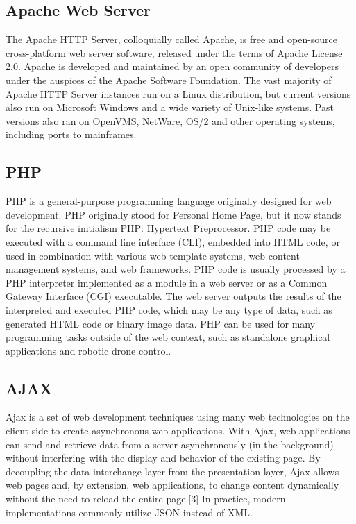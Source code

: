 \documentclass[12pt]{article}
\begin{document}
\subsection{Apache Web Server}
The Apache HTTP Server, colloquially called Apache, is free and open-source cross-platform web server software, released under the terms of Apache License 2.0. Apache is developed and maintained by an open community of developers under the auspices of the Apache Software Foundation. The vast majority of Apache HTTP Server instances run on a Linux distribution, but current versions also run on Microsoft Windows and a wide variety of Unix-like systems. Past versions also ran on OpenVMS, NetWare, OS/2 and other operating systems, including ports to mainframes.

\subsection{PHP}
PHP is a general-purpose programming language originally designed for web development. PHP originally stood for Personal Home Page,
but it now stands for the recursive initialism PHP: Hypertext Preprocessor. PHP code may be executed with a command line interface (CLI), embedded into HTML code, or used in combination with various web template systems, web content management systems, and web frameworks. PHP code is usually processed by a PHP interpreter implemented as a module in a web server or as a Common Gateway Interface (CGI) executable. The web server outputs the results of the interpreted and executed PHP code, which may be any type of data, such as generated HTML code or binary image data. PHP can be used for many programming tasks outside of the web context, such as standalone graphical applications and robotic drone control.

\subsection{AJAX}
Ajax is a set of web development techniques using many web technologies on the client side to create asynchronous web applications. With Ajax, web applications can send and retrieve data from a server asynchronously (in the background) without interfering with the display and behavior of the existing page. By decoupling the data interchange layer from the presentation layer, Ajax allows web pages and, by extension, web applications, to change content dynamically without the need to reload the entire page.[3] In practice, modern implementations commonly utilize JSON instead of XML.
\end{document}
